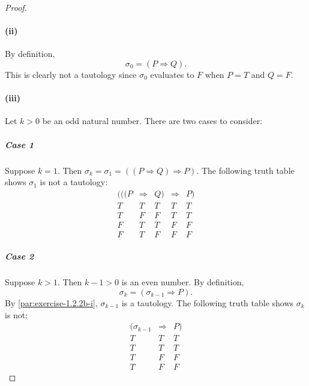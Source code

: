 \documentclass{report}
\begin{document}
\begin{proof}
    \paragraph{(ii)}%

      By definition, $$\sigma_0 = (P \Rightarrow Q).$$
      This is clearly not a tautology since $\sigma_0$ evaluates to $F$ when
        $P = T$ and $Q = F$.

    \paragraph{(iii)}%

      Let $k > 0$ be an odd natural number.
      There are two cases to consider:

      \subparagraph{Case 1}%

        Suppose $k = 1$.
        Then $\sigma_k = \sigma_1 = ((P \Rightarrow Q) \Rightarrow P)$.
        The following truth table shows $\sigma_1$ is not a tautology:
          $$\begin{array}{s|c|s|e|s}
            (((P & \Rightarrow & Q) & \Rightarrow & P) \\
            \hline
            T & T & T & T & T \\
            T & F & F & T & T \\
            F & T & T & F & F \\
            F & T & F & F & F
          \end{array}$$

      \subparagraph{Case 2}%

        Suppose $k > 1$.
        Then $k - 1 > 0$ is an even number.
        By definition, $$\sigma_k = (\sigma_{k-1} \Rightarrow P).$$
        By \eqref{par:exercise-1.2.2b-i}, $\sigma_{k-1}$ is a tautology.
        The following truth table shows $\sigma_k$ is not:
          $$\begin{array}{c|e|s}
            (\sigma_{k-1} & \Rightarrow & P) \\
            \hline
            T & T & T \\
            T & T & T \\
            T & F & F \\
            T & F & F
          \end{array}$$

  \end{proof}

\subsection{}%
\end{document}
